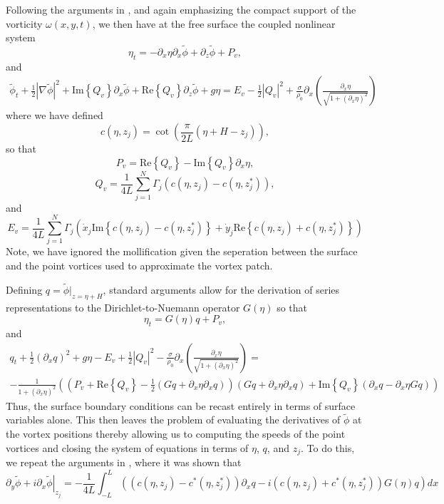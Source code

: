 \documentclass[a4paper,11pt]{article}
\newcommand{\p}{\partial}
\begin{document}
Following the arguments in \cite{curtis}, and again emphasizing the compact support of the vorticity $\omega(x,y,t)$, we then have at the free surface the coupled nonlinear system
\[
\eta_{t} = -\p_{x}\eta\p_{x}\tilde{\phi} + \p_{z}\tilde{\phi} + P_{v},
\]
and
\begin{multline*}
\tilde{\phi}_{t} + \frac{1}{2}\left|\nabla \tilde{\phi}\right|^{2} +\mbox{Im}\left\{Q_{v}\right\}\p_{x}\tilde{\phi} + \mbox{Re}\left\{Q_{v}\right\}\p_{z}\tilde{\phi} + g\eta = E_{v} - \frac{1}{2}\left|Q_{v}\right|^{2} + \frac{\sigma}{\rho_{0}}\p_{x}\left(\frac{\p_{x}\eta}{\sqrt{1+(\p_{x}\eta)^{2}}} \right)
\end{multline*}
where we have defined
\[
c(\eta,z_{j}) = \cot\left(\frac{\pi}{2L}\left(\eta+H-z_{j}\right)\right),
\]
so that 
\[
P_{v} = \mbox{Re}\left\{Q_{v}\right\} - \mbox{Im}\left\{Q_{v}\right\}\p_{x}\eta , 
\]
\[
Q_{v} = \frac{1}{4L}\sum_{j=1}^{N}\Gamma_{j}\left(c(\eta,z_{j}) - c(\eta,z^{\ast}_{j})\right),
\]
and
\[
E_{v} = \frac{1}{4L}\sum_{j=1}^{N}\Gamma_{j}\left(\dot{x}_{j}\mbox{Im}\left\{c(\eta,z_{j})-c(\eta,z^{\ast}_{j})\right\} + \dot{y}_{j}\mbox{Re}\left\{c(\eta,z_{j})+c(\eta,z^{\ast}_{j})\right\}\right)
\]
Note, we have ignored the mollification given the seperation between the surface and the point vortices used to approximate the vortex patch.  

Defining $q = \tilde{\phi}|_{z=\eta+H}$, standard arguments \cite{craig,curtis} allow for the derivation of series representations to the Dirichlet-to-Nuemann operator $G(\eta)$ so that 
\[
\eta_{t} = G(\eta)q + P_{v},
\]
and 
\begin{multline*}
q_{t} + \frac{1}{2}\left(\p_{x}q\right)^{2} + g\eta - E_{v} + \frac{1}{2}\left|Q_{v}\right|^{2} - \frac{\sigma}{\rho_{0}}\p_{x}\left(\frac{\p_{x}\eta}{\sqrt{1+(\p_{x}\eta)^{2}}} \right)=\\
- \frac{1}{1+(\p_{x}\eta)^{2}}\left(\left(P_{v}+\mbox{Re}\left\{Q_{v}\right\}-\frac{1}{2}\left(Gq+\p_{x}\eta\p_{x}q\right)\right)\left(Gq+\p_{x}\eta\p_{x}q\right) + \mbox{Im}\left\{Q_{v}\right\}(\p_{x}q - \p_{x}\eta Gq) \right) 
\end{multline*}
Thus, the surface boundary conditions can be recast entirely in terms of surface variables alone.  This then leaves the problem of evaluating the derivatives of $\tilde{\phi}$ at the vortex positions thereby allowing us to computing the speeds of the point vortices and closing the system of equations in terms of $\eta$, $q$, and $z_{j}$.  To do this, we repeat the arguments in \cite{curtis}, where it was shown that 
\[
\left. \p_{y}\tilde{\phi} + i\p_{x}\tilde{\phi}\right|_{z_{j}} = -\frac{1}{4L}\int_{-L}^{L}\left((c(\eta,z_{j})-c^{\ast}(\eta,z^{\ast}_{j}))\p_{x}q - i(c(\eta,z_{j})+c^{\ast}(\eta,z^{\ast}_{j}))G(\eta)q \right)dx
\]
\end{document}
